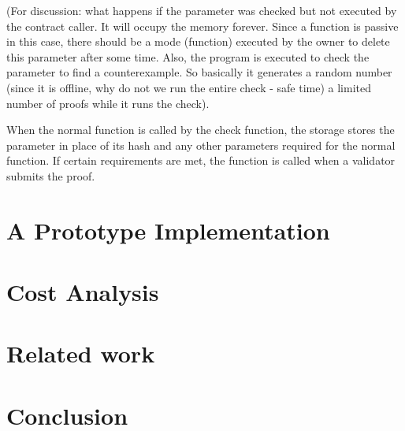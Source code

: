 \documentclass[runningheads]{llncs}
\begin{document}
(For discussion: what happens if the parameter was checked but not executed by the contract caller. It will occupy the memory forever. Since a function is passive in this case, there should be a mode (function) executed by the owner to delete this parameter after some time. Also, the program is executed to check the parameter to find a counterexample. So basically it generates a random number (since it is offline, why do not we run the entire check - safe time) a limited number of proofs while it runs the check).

When the normal function is called by the check function, the storage stores the parameter in place of its hash and any other parameters required for the normal function. If certain requirements are met, the function is called when a validator submits the proof.




\section{A Prototype Implementation}
\section{Cost Analysis}
\section{Related work}
\section{Conclusion}


\end{document}
